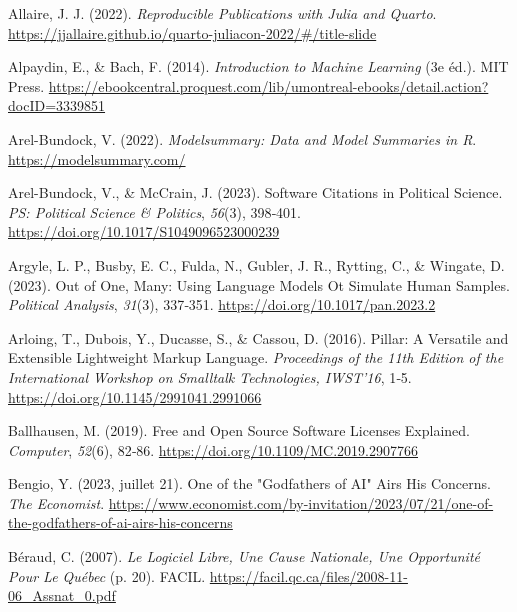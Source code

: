 \documentclass[
  letterpaper,
  DIV=11,
  numbers=noendperiod,
  oneside]{scrreprt}
\newlength{\cslhangindent}
\newlength{\cslentryspacingunit} %
\newenvironment{CSLReferences}[2] %
 {%
  \setlength{\parindent}{0pt}
  \ifodd #1
  \let\oldpar\par
  \def\par{\hangindent=\cslhangindent\oldpar}
  \fi
  \setlength{\parskip}{#2\cslentryspacingunit}
 }%
 {}
\begin{document}

\hypertarget{refs}{}
\begin{CSLReferences}{1}{0}
\leavevmode{}%
Allaire, J. J. (2022). \emph{Reproducible {Publications} with {Julia}
and {Quarto}}.
\url{https://jjallaire.github.io/quarto-juliacon-2022/\#/title-slide}

\leavevmode{}%
Alpaydin, E., \& Bach, F. (2014). \emph{Introduction to {Machine
Learning}} (3e éd.). MIT Press.
\url{https://ebookcentral.proquest.com/lib/umontreal-ebooks/detail.action?docID=3339851}

\leavevmode{}%
Arel-Bundock, V. (2022). \emph{Modelsummary: {Data} and {Model
Summaries} in {R}}. \url{https://modelsummary.com/}

\leavevmode{}%
Arel-Bundock, V., \& McCrain, J. (2023). Software {Citations} in
{Political Science}. \emph{PS: Political Science \& Politics},
\emph{56}(3), 398‑401. \url{https://doi.org/10.1017/S1049096523000239}

\leavevmode{}%
Argyle, L. P., Busby, E. C., Fulda, N., Gubler, J. R., Rytting, C., \&
Wingate, D. (2023). Out of {One}, {Many}: {Using Language Models} Ot
{Simulate Human Samples}. \emph{Political Analysis}, \emph{31}(3),
337‑351. \url{https://doi.org/10.1017/pan.2023.2}

\leavevmode{}%
Arloing, T., Dubois, Y., Ducasse, S., \& Cassou, D. (2016). Pillar: {A
Versatile} and {Extensible Lightweight Markup Language}.
\emph{Proceedings of the 11th Edition of the {International Workshop} on
{Smalltalk Technologies}, {IWST}'16}, 1‑5.
\url{https://doi.org/10.1145/2991041.2991066}

\leavevmode{}%
Ballhausen, M. (2019). Free and {Open Source Software Licenses
Explained}. \emph{Computer}, \emph{52}(6), 82‑86.
\url{https://doi.org/10.1109/MC.2019.2907766}

\leavevmode{}%
Bengio, Y. (2023, juillet 21). One of the "Godfathers of {AI}" Airs His
Concerns. \emph{The Economist}.
\url{https://www.economist.com/by-invitation/2023/07/21/one-of-the-godfathers-of-ai-airs-his-concerns}

\leavevmode{}%
Béraud, C. (2007). \emph{Le Logiciel Libre, Une Cause Nationale, Une
Opportunité Pour Le {Québec}} (p. 20). FACIL.
\url{https://facil.qc.ca/files/2008-11-06_Assnat_0.pdf}


\end{CSLReferences}
\end{document}
